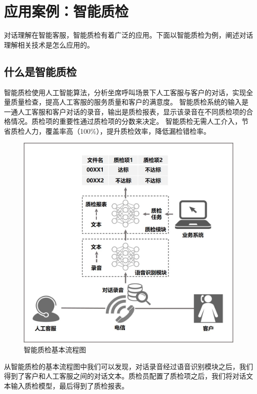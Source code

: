 \section{应用案例：智能质检}
对话理解在智能客服，智能质检有着广泛的应用。下面以智能质检为例，阐述对话理解相关技术是怎么应用的。
\subsection{什么是智能质检}

智能质检使用人工智能算法，分析坐席呼叫场景下人工客服与客户的对话，实现全量质量检查，提高人工客服的服务质量和客户的满意度。
智能质检系统的输入是一通人工客服和客户对话的录音，输出是质检报表，显示该录音在不同质检项的合格情况。质检项的重要性通过质检项的分数来决定。
智能质检无需人工介入，节省质检人力，覆盖率高（100\%），提升质检效率，降低漏检错检率。
\begin{figure}[h]
\centering
\includegraphics[scale=0.4]{./img/chapter4_b/qic_workflow.jpg}
\caption{智能质检基本流程图}
\label{fig1}
\end{figure}

从智能质检的基本流程图中我们可以发现，对话录音经过语音识别模块之后，我们得到了客户和人工客服之间的对话文本。质检员配置了质检项之后，我们将对话文本输入质检模型，最后得到了质检报表。
